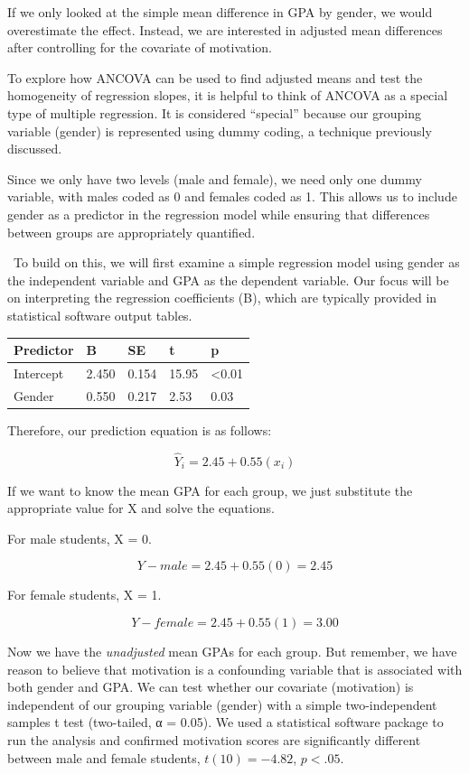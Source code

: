 \documentclass[
  letterpaper,
  DIV=11,
  numbers=noendperiod]{scrreprt}
\begin{document}
If we only looked at the simple mean difference in GPA by gender, we
would overestimate the effect. Instead, we are interested in adjusted
mean differences after controlling for the covariate of motivation.

To explore how ANCOVA can be used to find adjusted means and test the
homogeneity of regression slopes, it is helpful to think of ANCOVA as a
special type of multiple regression. It is considered ``special''
because our grouping variable (gender) is represented using dummy
coding, a technique previously discussed.

Since we only have two levels (male and female), we need only one dummy
variable, with males coded as 0 and females coded as 1. This allows us
to include gender as a predictor in the regression model while ensuring
that differences between groups are appropriately quantified.

\, To build on this, we will first examine a simple regression model
using gender as the independent variable and GPA as the dependent
variable. Our focus will be on interpreting the regression coefficients
(B), which are typically provided in statistical software output tables.

\begin{longtable}[]{@{}lllll@{}}
\toprule\noalign{}
Predictor & B & SE & t & p \\
\midrule\noalign{}
\endhead
\bottomrule\noalign{}
\endlastfoot
Intercept & 2.450 & 0.154 & 15.95 & \textless0.01 \\
Gender & 0.550 & 0.217 & 2.53 & 0.03 \\
\end{longtable}

Therefore, our prediction equation is as follows:\,

\[
\hat{Y}_i = 2.45 + 0.55(x_i)
\]

If we want to know the mean GPA for each group, we just substitute the
appropriate value for X and solve the equations.\,\,

For male students, X = 0.

\[
Y - male = 2.45 + 0.55(0) = 2.45
\]

For female students, X = 1.

\[
Y - female = 2.45 + 0.55(1) = 3.00
\]

Now we have the \emph{unadjusted} mean GPAs for each group. But
remember, we have reason to believe that motivation is a confounding
variable that is associated with both gender and GPA. We can test
whether our covariate (motivation) is independent of our grouping
variable (gender) with a simple two-independent samples t test
(two-tailed, α = 0.05). We used a statistical software package to run
the analysis and confirmed motivation scores are significantly different
between male and female students, \(t(10) = -4.82\), \(p < .05\).\,
\end{document}
